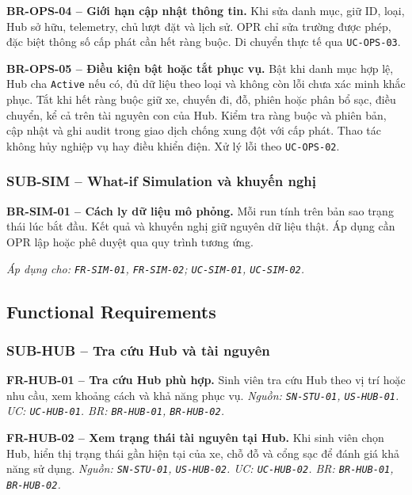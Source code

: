 \medskip
\noindent\textbf{BR-OPS-04 -- Giới hạn cập nhật thông tin.} Khi sửa danh mục, giữ ID, loại, Hub sở hữu, telemetry, chủ lượt đặt và lịch sử. OPR chỉ sửa trường được phép, đặc biệt thông số cấp phát cần hết ràng buộc. Di chuyển thực tế qua \texttt{UC-OPS-03}.

\medskip
\noindent\textbf{BR-OPS-05 -- Điều kiện bật hoặc tắt phục vụ.} Bật khi danh mục hợp lệ, Hub cha \texttt{Active} nếu có, đủ dữ liệu theo loại và không còn lỗi chưa xác minh khắc phục. Tắt khi hết ràng buộc giữ xe, chuyến đi, đỗ, phiên hoặc phân bổ sạc, điều chuyển, kể cả trên tài nguyên con của Hub. Kiểm tra ràng buộc và phiên bản, cập nhật và ghi audit trong giao dịch chống xung đột với cấp phát. Thao tác không hủy nghiệp vụ hay điều khiển điện. Xử lý lỗi theo \texttt{UC-OPS-02}.

\subsubsection{SUB-SIM -- What-if Simulation và khuyến nghị}

\noindent\textbf{BR-SIM-01 -- Cách ly dữ liệu mô phỏng.} Mỗi run tính trên bản sao trạng thái lúc bắt đầu. Kết quả và khuyến nghị giữ nguyên dữ liệu thật. Áp dụng cần OPR lập hoặc phê duyệt qua quy trình tương ứng.

\textit{Áp dụng cho: \texttt{FR-SIM-01}, \texttt{FR-SIM-02}; \texttt{UC-SIM-01}, \texttt{UC-SIM-02}.}

\subsection{Functional Requirements}

\subsubsection{SUB-HUB -- Tra cứu Hub và tài nguyên}

\noindent\textbf{FR-HUB-01 -- Tra cứu Hub phù hợp.} Sinh viên tra cứu Hub theo vị trí hoặc nhu cầu, xem khoảng cách và khả năng phục vụ.
\textit{Nguồn: \texttt{SN-STU-01}, \texttt{US-HUB-01}. UC: \texttt{UC-HUB-01}. BR: \texttt{BR-HUB-01}, \texttt{BR-HUB-02}.}

\medskip
\noindent\textbf{FR-HUB-02 -- Xem trạng thái tài nguyên tại Hub.} Khi sinh viên chọn Hub, hiển thị trạng thái gần hiện tại của xe, chỗ đỗ và cổng sạc để đánh giá khả năng sử dụng.
\textit{Nguồn: \texttt{SN-STU-01}, \texttt{US-HUB-02}. UC: \texttt{UC-HUB-02}. BR: \texttt{BR-HUB-01}, \texttt{BR-HUB-02}.}

